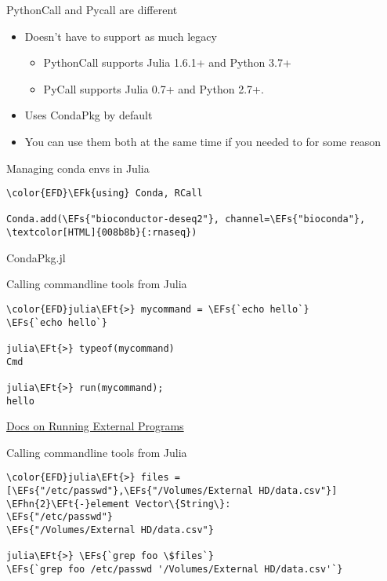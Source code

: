 \documentclass[bigger]{beamer}
\newcommand{\EFs}[1]{\textcolor{EFs}{#1}} %
\newcommand{\EFk}[1]{\textcolor{EFk}{#1}} %
\newcommand{\EFt}[1]{\textcolor{EFt}{#1}} %
\newcommand{\EFhn}[1]{\textcolor{EFhn}{\textbf{#1}}} %
\begin{document}
\begin{frame}[label={sec:org9c9cf36}]{PythonCall and Pycall are different}
\begin{itemize}
\item Doesn't have to support as much legacy
\begin{itemize}
\item PythonCall supports Julia 1.6.1+ and Python 3.7+
\item PyCall supports Julia 0.7+ and Python 2.7+.
\end{itemize}
\item Uses CondaPkg by default
\item You can use them both at the same time if you needed to for some reason
\end{itemize}
\end{frame}

\begin{frame}[label={sec:orgabbf9d6},fragile]{Managing conda envs in Julia}
 \begin{Code}
\begin{Verbatim}
\color{EFD}\EFk{using} Conda, RCall

Conda.add(\EFs{"bioconductor-deseq2"}, channel=\EFs{"bioconda"}, \textcolor[HTML]{008b8b}{:rnaseq})
\end{Verbatim}
\end{Code}
\end{frame}

\begin{frame}[label={sec:org8e522b7}]{CondaPkg.jl}
\end{frame}
\begin{frame}[label={sec:org5e751c4},fragile]{Calling commandline tools from Julia}
 \begin{Code}
\begin{Verbatim}
\color{EFD}julia\EFt{>} mycommand = \EFs{`echo hello`}
\EFs{`echo hello`}

julia\EFt{>} typeof(mycommand)
Cmd

julia\EFt{>} run(mycommand);
hello
\end{Verbatim}
\end{Code}

\href{https://docs.julialang.org/en/v1/manual/running-external-programs/}{Docs on Running External Programs}
\end{frame}
\begin{frame}[label={sec:org39d576d},fragile]{Calling commandline tools from Julia}
 \small
\begin{Code}
\begin{Verbatim}
\color{EFD}julia\EFt{>} files = [\EFs{"/etc/passwd"},\EFs{"/Volumes/External HD/data.csv"}]
\EFhn{2}\EFt{-}element Vector\{String\}:
\EFs{"/etc/passwd"}
\EFs{"/Volumes/External HD/data.csv"}

julia\EFt{>} \EFs{`grep foo \$files`}
\EFs{`grep foo /etc/passwd '/Volumes/External HD/data.csv'`}
\end{Verbatim}
\end{Code}
\end{frame}
\end{document}
